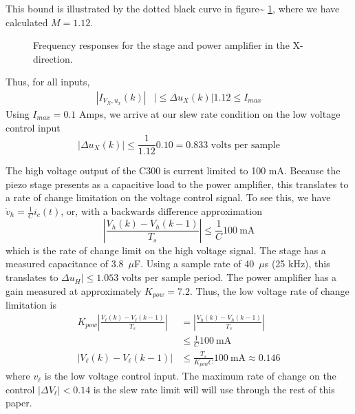 \documentclass[journal,12pt,twocolumn,twoside]{IEEEtran/IEEEtran}
\begin{document}
This bound is illustrated by the dotted black curve in figure\textasciitilde{} \ref{fig:orgc576458}, where we have calculated \(M=1.12\).

\begin{figure}[htbp]
\centering

\caption{\label{fig:orgc576458}
Frequency responses for the stage and power amplifier in the X-direction.}
\end{figure}

Thus, for all inputs,
\begin{align}
|I_{V_{X}, u_{x}}(k)| &|\leq \Delta u_{X}(k)| 1.12 \leq I_{max}
\end{align}
Using \(I_{max} = 0.1\) Amps, we arrive at our slew rate condition on the low voltage control input
\begin{equation}
|\Delta u_{X}(k)| \leq \frac{1}{1.12} 0.10 = 0.833 \text{~volts per sample}
\end{equation}



The high voltage output of the C300 is current limited to 100 mA. Because the piezo stage presents as a capacitive load to the power amplifier, this translates to a rate of change limitation on the voltage control signal. To see this, we have $\dot v_{h} = \frac{1}{C} i_c(t)$, or, with a backwards difference approximation
\begin{equation}
  |\frac{V_{h}(k) - V_{h}(k-1)}{T_s}| \leq \frac{1}{C} 100~\text{mA}
\end{equation}
which is the rate of change limit on the high voltage signal. The stage has a measured capacitance of 3.8~$\mu$F. Using a sample rate of 40~$\mu$s (25 kHz), this translates to $\Delta u_{H}|\leq 1.053$ volts per sample period. The power amplifier has a gain measured at approximately $K_{pow}=7.2$. Thus, the low voltage rate of change limitation is
\begin{align}
  K_{pow}|\frac{V_{\ell}(k) - V_{\ell}(k-1)}{T_s}|  &= |\frac{V_{h}(k) - V_{h}(k-1)}{T_s}|\\
  &\leq \frac{1}{C} 100~\text{mA}\\
|V_{\ell}(k) - V_{\ell}(k-1)|  &\leq \frac{T_s}{K_{pow}C} 100~\text{mA} \approx 0.146 \label{eqn:dvlow_max}
\end{align}
where $v_{\ell}$ is the low voltage control input. The maximum rate of change on the control $|\Delta V_{\ell}| <0.14$ is the slew rate limit will will use through the rest of this paper. 
\end{document}

